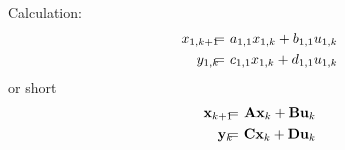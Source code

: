 %
%
%
%
%
%
%
%
Calculation:
\begin{eqnarray*}
	x_{1,k+1} \mkern-11.5mu&=&\mkern-11.5mu a_{1,1} x_{1,k} + b_{1,1} u_{1,k}
	\\
	y_{1,k} \mkern-11.5mu&=&\mkern-11.5mu c_{1,1} x_{1,k} + d_{1,1} u_{1,k}
\end{eqnarray*}
or short
\begin{eqnarray*}
	\mathbf{x}_{k+1} \mkern-11.5mu&=&\mkern-11.5mu \mathbf{A} \mathbf{x}_k + \mathbf{B} \mathbf{u}_k
	\\
	\mathbf{y}_k \mkern-11.5mu&=&\mkern-11.5mu \mathbf{C} \mathbf{x}_k + \mathbf{D} \mathbf{u}_k
\end{eqnarray*}